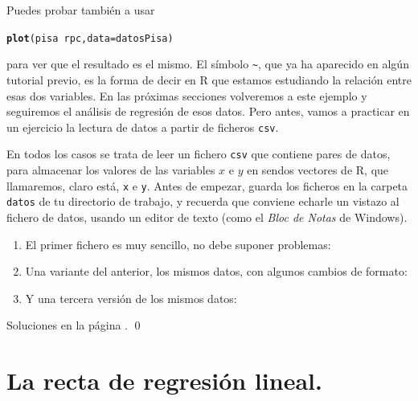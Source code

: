 \documentclass[10pt,a4paper]{article}\usepackage[]{graphicx}\usepackage[]{color}
\makeatletter
\newcommand{\hlopt}[1]{\textcolor[rgb]{0,0,0}{#1}}%
\newcommand{\hlstd}[1]{\textcolor[rgb]{0.345,0.345,0.345}{#1}}%
\newcommand{\hlkwc}[1]{\textcolor[rgb]{0.333,0.667,0.333}{#1}}%
\newcommand{\hlkwd}[1]{\textcolor[rgb]{0.737,0.353,0.396}{\textbf{#1}}}%
\newenvironment{kframe}{%
 \def\at@end@of@kframe{}%
 \ifinner\ifhmode%
  \def\at@end@of@kframe{\end{minipage}}%
  \begin{minipage}{\columnwidth}%
 \fi\fi%
 \def\FrameCommand##1{\hskip\@totalleftmargin \hskip-\fboxsep
 \colorbox{shadecolor}{##1}\hskip-\fboxsep
     \hskip-\linewidth \hskip-\@totalleftmargin \hskip\columnwidth}%
 \MakeFramed {\advance\hsize-\width
   \@totalleftmargin\z@ \linewidth\hsize
   \@setminipage}}%
 {\par\unskip\endMakeFramed%
 \at@end@of@kframe}
\newenvironment{knitrout}{}{} %
\newcounter {cont01}
\makeatother
\begin{document}
Puedes probar también a usar
\begin{knitrout}
\color{fgcolor}\begin{kframe}
\begin{alltt}
\hlkwd{plot}\hlstd{(pisa} \hlopt{~} \hlstd{rpc,} \hlkwc{data}\hlstd{=datosPisa)}
\end{alltt}
\end{kframe}
\end{knitrout}
para ver que el resultado es el mismo. El símbolo \verb#~#, que ya ha aparecido en algún tutorial previo, es la forma de decir en R que estamos estudiando la relación entre esas dos variables.  En las próximas secciones volveremos a este ejemplo y seguiremos el análisis de regresión de esos datos. Pero antes, vamos a practicar en un ejercicio la lectura de datos a partir de
ficheros {\tt csv}.

\begin{ejercicio}
\label{tut10:ejercicio01}
En todos los casos se trata de leer un fichero {\tt csv} que contiene pares de datos, para
almacenar los valores de las variables $x$ e $y$ en sendos vectores de R, que llamaremos, claro está, {\tt x} e {\tt y}.  Antes de empezar, guarda los ficheros en la carpeta {\tt datos}  de tu directorio de trabajo, y recuerda que conviene echarle un vistazo al fichero de datos, usando un editor de texto (como el {\em Bloc de Notas} de Windows).
\begin{enumerate}
  \item El primer fichero es muy sencillo, no debe suponer
      problemas:\\
  \item Una variante del anterior, los mismos datos, con algunos cambios de formato:\\
  \item Y una tercera versión de los mismos datos:\\
\end{enumerate}
Soluciones en la página \pageref{tut10:ejercicio01:sol}.
\qed
\end{ejercicio}



\section{La recta de regresión lineal.}
\end{document}
